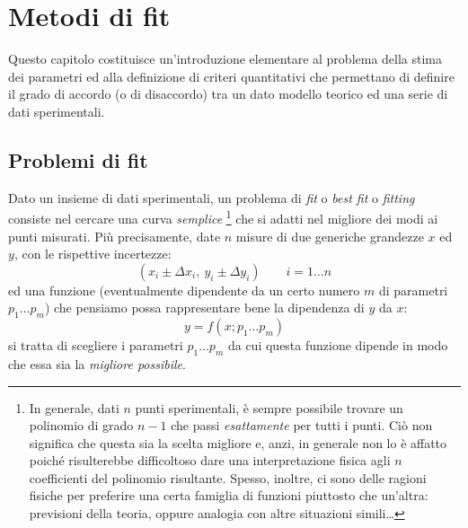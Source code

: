 \chapter{Metodi di fit}
\label{chap:fit}
\mt

Questo capitolo costituisce un'introduzione elementare al problema
della stima dei parametri ed alla definizione di criteri quantitativi
che permettano di definire il grado di accordo (o di disaccordo) tra
un dato modello teorico ed una serie di dati sperimentali.


\section{Problemi di fit}

Dato un insieme di dati sperimentali, un problema
di {\itshape fit} o {\itshape best fit} o {\itshape fitting}
consiste nel cercare una curva {\itshape semplice}%
\footnote{
In generale, dati $n$ punti sperimentali, \`e sempre possibile
trovare un polinomio di grado $n-1$ che passi {\itshape esattamente}
per tutti i punti. Ci\`o non significa che questa sia la scelta migliore
e, anzi, in generale non lo \`e affatto poich\'e risulterebbe
difficoltoso dare una interpretazione fisica agli $n$ coefficienti
del polinomio risultante. Spesso, inoltre, ci sono delle ragioni
fisiche per preferire una certa famiglia di funzioni piuttosto che
un'altra: previsioni della teoria, oppure analogia con altre situazioni
simili\ldots
}
che si adatti nel migliore dei modi ai punti misurati.
Pi\`u precisamente, date $n$ misure di due generiche grandezze $x$ ed $y$,
con le rispettive incertezze:
$$
(x_i \pm \Delta x_i, ~ y_i \pm \Delta y_i ) \qquad i=1\ldots n
$$
ed una funzione (eventualmente dipendente da un certo numero $m$ di parametri
$p_1 \ldots p_m$) che pensiamo possa rappresentare bene la dipendenza di
$y$ da $x$:
$$
y = f(x; p_1 \ldots p_m)
$$
si tratta di scegliere i parametri $p_1 \ldots p_m$ da cui questa funzione
dipende in modo che essa sia la {\itshape migliore possibile}.

\begin{exemplify}


\end{exemplify}

